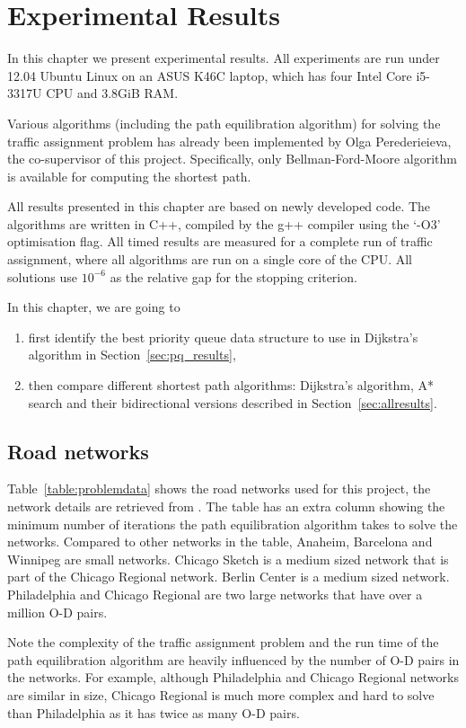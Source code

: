 \chapter{Experimental Results}\label{chap:results}
In this chapter we present experimental results.
All experiments are run under 12.04 Ubuntu Linux on an ASUS K46C laptop,
which has four Intel Core i5-3317U CPU and 3.8GiB RAM.

Various algorithms (including the path equilibration algorithm) for solving
the traffic assignment problem has already been implemented by Olga Perederieieva, the co-supervisor of this project.
Specifically, only Bellman-Ford-Moore algorithm is available for computing the shortest path. 

All results presented in this chapter are based on newly developed code.
The algorithms are written in C++, compiled by the g++ compiler using the `-O3' optimisation flag.
All timed results are measured for a complete run of traffic assignment,
where all algorithms are run on a single core of the CPU.
All solutions use $10^{-6}$ as the relative gap for the stopping criterion.

In this chapter, we are going to
\begin{enumerate}
    \item first identify the best priority queue data structure to use in Dijkstra's algorithm in Section~\ref{sec:pq_results},
    \item then compare different shortest path algorithms: Dijkstra's algorithm, A* search and their bidirectional versions described in Section~\ref{sec:allresults}.
\end{enumerate}

\section{Road networks}

Table~\ref{table:problemdata} shows the road networks used for this project, the network details are retrieved from \citet{ProblemData}.
The table has an extra column showing the minimum number of iterations the path equilibration algorithm takes to solve the networks.
Compared to other networks in the table,
Anaheim, Barcelona and Winnipeg are small networks.
Chicago Sketch is a medium sized network that is part of the Chicago Regional network.
Berlin Center is a medium sized network.
Philadelphia and Chicago Regional are two large networks that have over a million O-D pairs.

Note the complexity of the traffic assignment problem and the run time of the path equilibration algorithm are heavily influenced by the number of O-D pairs in the networks.
For example, although Philadelphia and Chicago Regional networks are similar in size,
Chicago Regional is much more complex and hard to solve than Philadelphia as it has twice as many O-D pairs.

